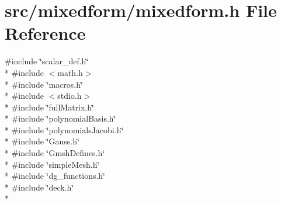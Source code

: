 \section{src/mixedform/mixedform.h File Reference}
\label{mixedform_8h}
{\ttfamily \#include \char`\"{}scalar\-\_\-def.\-h\char`\"{}}\\*
{\ttfamily \#include $<$math.\-h$>$}\\*
{\ttfamily \#include \char`\"{}macros.\-h\char`\"{}}\\*
{\ttfamily \#include $<$stdio.\-h$>$}\\*
{\ttfamily \#include \char`\"{}full\-Matrix.\-h\char`\"{}}\\*
{\ttfamily \#include \char`\"{}polynomial\-Basis.\-h\char`\"{}}\\*
{\ttfamily \#include \char`\"{}polynomials\-Jacobi.\-h\char`\"{}}\\*
{\ttfamily \#include \char`\"{}Gauss.\-h\char`\"{}}\\*
{\ttfamily \#include \char`\"{}Gmsh\-Defines.\-h\char`\"{}}\\*
{\ttfamily \#include \char`\"{}simple\-Mesh.\-h\char`\"{}}\\*
{\ttfamily \#include \char`\"{}dg\-\_\-functions.\-h\char`\"{}}\\*
{\ttfamily \#include \char`\"{}deck.\-h\char`\"{}}\\*
